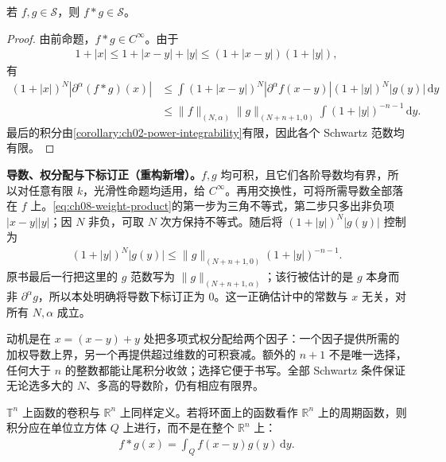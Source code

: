 \documentclass[../../main.tex]{subfiles}
\begin{document}
\begin{proposition}\label{proposition:ch08-schwartz-convolution}
若 $f,g\in\mathcal S$，则 $f*g\in\mathcal S$。
\end{proposition}
\begin{proof}
由前命题，$f*g\in C^\infty$。由于
\begin{align}\label{eq:ch08-weight-product}
1+|x|\leqslant1+|x-y|+|y|\leqslant(1+|x-y|)(1+|y|),
\end{align}
有
\begin{align*}
(1+|x|)^N|\partial^\alpha(f*g)(x)|
&\leqslant\int(1+|x-y|)^N|\partial^\alpha f(x-y)|
 (1+|y|)^N|g(y)|\,\mathrm dy\\
&\leqslant\|f\|_{(N,\alpha)}\|g\|_{(N+n+1,0)}
\int(1+|y|)^{-n-1}\,\mathrm dy.
\end{align*}
最后的积分由\cref{corollary:ch02-power-integrability}有限，因此各个 Schwartz 范数均有限。
\end{proof}
\begin{remark}
\textbf{导数、权分配与下标订正（重构新增）。}$f,g$ 均可积，且它们各阶导数均有界，所以对任意有限 $k$，光滑性命题均适用，给 $C^\infty$。再用交换性，可将所需导数全部落在 $f$ 上。\cref{eq:ch08-weight-product}的第一步为三角不等式，第二步只多出非负项 $|x-y||y|$；因 $N$ 非负，可取 $N$ 次方保持不等式。随后将 $(1+|y|)^N|g(y)|$ 控制为
\begin{align*}
(1+|y|)^N|g(y)|\leqslant
\|g\|_{(N+n+1,0)}(1+|y|)^{-n-1}.
\end{align*}
原书最后一行把这里的 $g$ 范数写为 $\|g\|_{(N+n+1,\alpha)}$；该行被估计的是 $g$ 本身而非 $\partial^\alpha g$，所以本处明确将导数下标订正为 $0$。这一正确估计中的常数与 $x$ 无关，对所有 $N,\alpha$ 成立。

动机是在 $x=(x-y)+y$ 处把多项式权分配给两个因子：一个因子提供所需的加权导数上界，另一个再提供超过维数的可积衰减。额外的 $n+1$ 不是唯一选择，任何大于 $n$ 的整数都能让尾积分收敛；选择它便于书写。全部 Schwartz 条件保证无论选多大的 $N$、多高的导数阶，仍有相应有限界。
\end{remark}
\begin{definition}[环面上的卷积]\label{definition:ch08-torus-convolution}
$\mathbb T^n$ 上函数的卷积与 $\mathbb R^n$ 上同样定义。若将环面上的函数看作 $\mathbb R^n$ 上的周期函数，则积分应在单位立方体 $Q$ 上进行，而不是在整个 $\mathbb R^n$ 上：
\begin{align*}
f*g(x)=\int_Q f(x-y)g(y)\,\mathrm dy.
\end{align*}
\end{definition}
\end{document}

